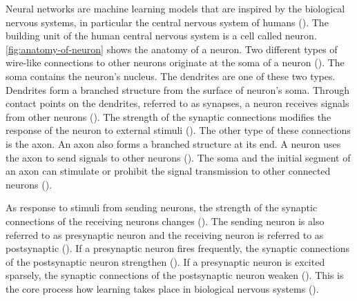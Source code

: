 \documentclass{BachelorBUI}
\begin{document}
            Neural networks are machine learning models that are inspired by the biological nervous systems, in particular the central nervous system of humans (\cite{Aggarwal:2018}). The building unit of the human central nervous system is a cell called neuron. \autoref{fig:anatomy-of-neuron} shows the anatomy of a neuron. Two different types of wire-like connections to other neurons originate at the soma of a neuron (\cite{Gerstner:2014}). The soma contains the neuron's nucleus. The dendrites are one of these two types. Dendrites form a branched structure from the surface of neuron's soma. Through contact points on the dendrites, referred to as synapses, a neuron receives signals from other neurons (\cite{Gerstner:2014}). The strength of the synaptic connections modifies the response of the neuron to external stimuli (\cite{Aggarwal:2018}). The other type of these connections is the axon. An axon also forms a branched structure at its end. A neuron uses the axon to send signals to other neurons (\cite{Gerstner:2014}). The soma and the initial segment of an axon can stimulate or prohibit the signal transmission to other connected neurons (\cite{Gerstner:2014}). 
            
            As response to stimuli from sending neurons, the strength of the synaptic connections of the receiving neurons changes (\cite{Aggarwal:2018}). The sending neuron is also referred to as presynaptic neuron and the receiving neuron is referred to as postsynaptic (\cite{Gerstner:2014}). If a presynaptic neuron fires frequently, the synaptic connections of the postsynaptic neuron strengthen (\cite{Aggarwal:2018}). If a presynaptic neuron is excited sparsely, the synaptic connections of the postsynaptic neuron weaken (\cite{Aggarwal:2018}). This is the core process how learning takes place in biological nervous systems (\cite{Aggarwal:2018}). 
\end{document}
